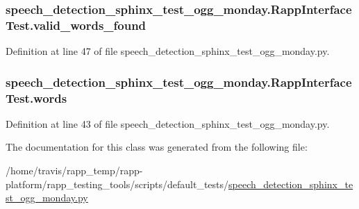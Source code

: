 \hypertarget{classspeech__detection__sphinx__test__ogg__monday_1_1RappInterfaceTest_a4cc4a37f471fb42e382e3bdc66c0a610}{
\subsubsection[{valid\-\_\-words\-\_\-found}]{\setlength{\rightskip}{0pt plus 5cm}speech\-\_\-detection\-\_\-sphinx\-\_\-test\-\_\-ogg\-\_\-monday.\-Rapp\-Interface\-Test.\-valid\-\_\-words\-\_\-found}}\label{classspeech__detection__sphinx__test__ogg__monday_1_1RappInterfaceTest_a4cc4a37f471fb42e382e3bdc66c0a610}


Definition at line 47 of file speech\-\_\-detection\-\_\-sphinx\-\_\-test\-\_\-ogg\-\_\-monday.\-py.

\hypertarget{classspeech__detection__sphinx__test__ogg__monday_1_1RappInterfaceTest_a7fb566119671b1a8fa9f991d6eb919be}{
\subsubsection[{words}]{\setlength{\rightskip}{0pt plus 5cm}speech\-\_\-detection\-\_\-sphinx\-\_\-test\-\_\-ogg\-\_\-monday.\-Rapp\-Interface\-Test.\-words}}\label{classspeech__detection__sphinx__test__ogg__monday_1_1RappInterfaceTest_a7fb566119671b1a8fa9f991d6eb919be}


Definition at line 43 of file speech\-\_\-detection\-\_\-sphinx\-\_\-test\-\_\-ogg\-\_\-monday.\-py.



The documentation for this class was generated from the following file\-:\begin{DoxyCompactItemize}
\item 
/home/travis/rapp\-\_\-temp/rapp-\/platform/rapp\-\_\-testing\-\_\-tools/scripts/default\-\_\-tests/\hyperlink{speech__detection__sphinx__test__ogg__monday_8py}{speech\-\_\-detection\-\_\-sphinx\-\_\-test\-\_\-ogg\-\_\-monday.\-py}\end{DoxyCompactItemize}
